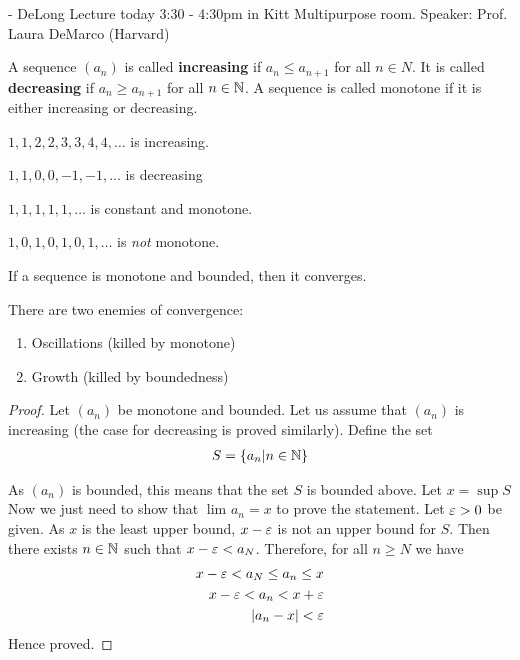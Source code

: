 
- DeLong Lecture today 3:30 - 4:30pm in Kitt Multipurpose room. Speaker: Prof. Laura DeMarco (Harvard)


\begin{definition}
	A sequence $\left( a_n \right) $ is called \textbf{increasing} if $a_n \le a_{n+1}$ for all $n \in N$. It is called \textbf{decreasing} if $a_n \ge a_{n+1}$ for all $n \in \mathbb{N}$. A sequence is called monotone if it is either increasing or decreasing.
\end{definition}

\begin{eg}
	$1, 1, 2, 2, 3, 3, 4, 4, \ldots$ is increasing.
\end{eg}

\begin{eg}
	$1, 1, 0, 0, -1, -1, \ldots$ is decreasing
\end{eg}

\begin{eg}
	$1, 1, 1, 1, 1, \ldots$	is constant and monotone.
\end{eg}

\begin{eg}
	$1, 0, 1, 0, 1, 0, 1, \ldots$ is \textit{not} monotone.
\end{eg}

\begin{theorem}
	If a sequence is monotone and bounded, then it converges.	
\end{theorem}
\begin{note}
	There are two enemies of convergence:
	\begin{enumerate}
		\item Oscillations (killed by monotone)
		\item Growth (killed by boundedness)
	\end{enumerate}
\end{note}

\begin{proof}
	Let $\left( a_n \right) $ be monotone and bounded. Let us assume that $\left( a_n \right) $ is increasing (the case for decreasing is proved similarly). Define the set
	\begin{align}
		S = \{a_n | n \in \mathbb{N}\} 
	\end{align}

	As $\left( a_n \right) $ is bounded, this means that the set $S$ is bounded above. Let $x = \sup S$ Now we just need to show that  $\lim_{} a_n = x$ to prove the statement. Let $\e > 0$ be given. As $x$ is the least upper bound, $x - \e$ is not an upper bound for $S$. Then there exists $n \in \mathbb{N}$ such that $x - \e < a_N$. Therefore, for all $n \ge N$ we have
	\begin{align}
		x- \e < a_N \le a_n \le x \\
		x - \e < a_n < x + \e \\
		\left|a_n - x\right| < \e
	\end{align}
	Hence proved.
\end{proof}

